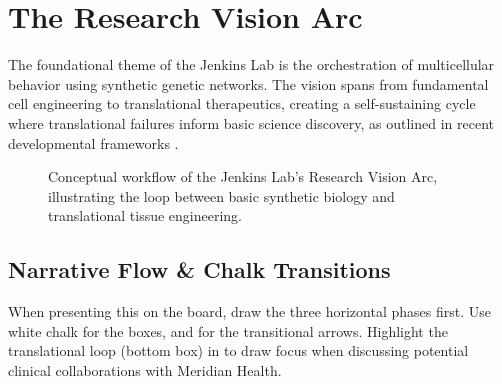 \section{The Research Vision Arc}
The foundational theme of the Jenkins Lab is the orchestration of multicellular behavior using synthetic genetic networks. The vision spans from fundamental cell engineering to translational therapeutics, creating a self-sustaining cycle where translational failures inform basic science discovery, as outlined in recent developmental frameworks \cite{apex2025report}.

\begin{figure}[h]
\centering
{}
\caption{Conceptual workflow of the Jenkins Lab's Research Vision Arc, illustrating the loop between basic synthetic biology and translational tissue engineering.}
\label{fig:vision_arc}
\end{figure}

\subsection{Narrative Flow \& Chalk Transitions}
When presenting this on the board, draw the three horizontal phases first. Use white chalk for the boxes, and  for the transitional arrows. Highlight the translational loop (bottom box) in  to draw focus when discussing potential clinical collaborations with Meridian Health.

